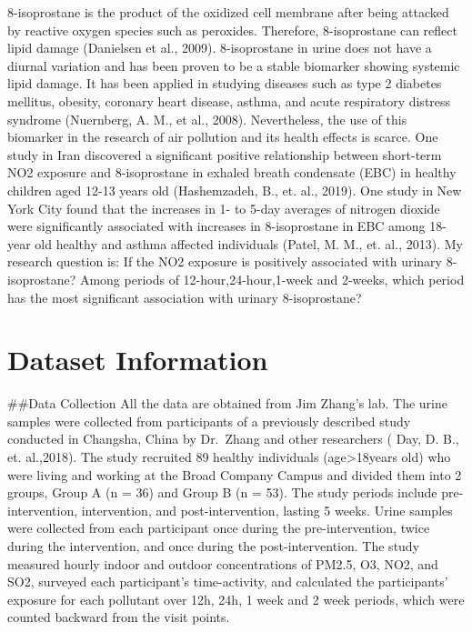 \documentclass[12pt,]{article}
\begin{document}
8-isoprostane is the product of the oxidized cell membrane after being
attacked by reactive oxygen species such as peroxides. Therefore,
8-isoprostane can reflect lipid damage (Danielsen et al., 2009).
8-isoprostane in urine does not have a diurnal variation and has been
proven to be a stable biomarker showing systemic lipid damage. It has
been applied in studying diseases such as type 2 diabetes mellitus,
obesity, coronary heart disease, asthma, and acute respiratory distress
syndrome (Nuernberg, A. M., et al., 2008). Nevertheless, the use of this
biomarker in the research of air pollution and its health effects is
scarce. One study in Iran discovered a significant positive relationship
between short-term NO2 exposure and 8-isoprostane in exhaled breath
condensate (EBC) in healthy children aged 12-13 years old (Hashemzadeh,
B., et. al., 2019). One study in New York City found that the increases
in 1- to 5-day averages of nitrogen dioxide were significantly
associated with increases in 8-isoprostane in EBC among 18-year old
healthy and asthma affected individuals (Patel, M. M., et. al., 2013).
My research question is: If the NO2 exposure is positively associated
with urinary 8-isoprostane? Among periods of 12-hour,24-hour,1-week and
2-weeks, which period has the most significant association with urinary
8-isoprostane?

\hypertarget{dataset-information}{%
\section{Dataset Information}\label{dataset-information}}

\#\#Data Collection All the data are obtained from Jim Zhang's lab. The
urine samples were collected from participants of a previously described
study conducted in Changsha, China by Dr.~Zhang and other researchers (
Day, D. B., et. al.,2018). The study recruited 89 healthy individuals
(age\textgreater18years old) who were living and working at the Broad
Company Campus and divided them into 2 groups, Group A (n = 36) and
Group B (n = 53). The study periods include pre-intervention,
intervention, and post-intervention, lasting 5 weeks. Urine samples were
collected from each participant once during the pre-intervention, twice
during the intervention, and once during the post-intervention. The
study measured hourly indoor and outdoor concentrations of PM2.5, O3,
NO2, and SO2, surveyed each participant's time-activity, and calculated
the participants' exposure for each pollutant over 12h, 24h, 1 week and
2 week periods, which were counted backward from the visit points.
\end{document}
